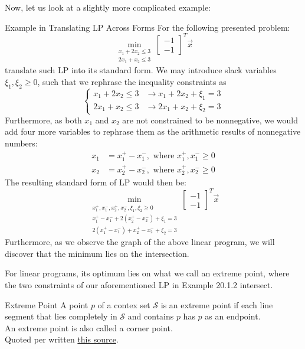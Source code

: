 Now, let us look at a slightly more complicated example:
\begin{ln-explain}{Example in Translating LP Across Forms}{}
    For the following presented problem:
    \[
        \min_{
            \substack{
                x_1 + 2x_2 \leq 3 \\
                2x_1 + x_2 \leq 3
            }
        } \begin{bmatrix} -1 \\ -1 \end{bmatrix}^T \vec{x}
    \]
    translate such LP into its standard form.
    \tcblower
    We may introduce slack variables $\xi_1, \xi_2 \geq 0$, such that we rephrase the inequality constraints as
    \[
        \begin{cases}
            x_1 + 2x_2 \leq 3 &\rightarrow x_1 + 2x_2 + \xi_1 = 3 \\
            2x_1 + x_2 \leq 3 &\rightarrow 2x_1 + x_2 + \xi_2 = 3
        \end{cases}
    \]
    Furthermore, as both $x_1$ and $x_2$ are not constrained to be nonnegative, we would add four more variables to rephrase them as the arithmetic results of nonnegative numbers:
    \begin{align*}
        x_1 &= x_1^+ - x_1^-, \text{ where } x_1^+, x_1^- \geq 0 \\
        x_2 &= x_2^+ - x_2^-, \text{ where } x_2^+, x_2^- \geq 0
    \end{align*}
    The resulting standard form of LP would then be:
    \[
        \min_{
            \substack{
                x_1^+, x_1^-, x_2^+, x_2^-, \xi_1, \xi_2 \geq 0 \\
                x_1^+ - x_1^- + 2 (x_2^+ - x_2^-) + \xi_1 = 3 \\
                2 (x_1^+ - x_1^-) + x_2^+ - x_2^- + \xi_2 = 3
            }
        } \begin{bmatrix} -1 \\ -1 \end{bmatrix}^T \vec{x}
    \]
    Furthermore, as we observe the graph of the above linear program, we will discover that the minimum lies on the intersection.
\end{ln-explain}
For linear programs, its optimum lies on what we call an extreme point, where the two constraints of our aforementioned LP in Example 20.1.2 intersect.
\begin{ln-define}{Extreme Point}{}
    A point $p$ of a contex set $\mathcal{S}$ is an extreme point if each line segment that lies completely in $\mathcal{S}$ and contains $p$ has $p$ as an endpoint. \\
    An extreme point is also called a corner point. \\
    Quoted per written \href{http://www.columbia.edu/~cs2035/courses/csor4231.F09/lpdef.pdf}{this source}.
\end{ln-define}

